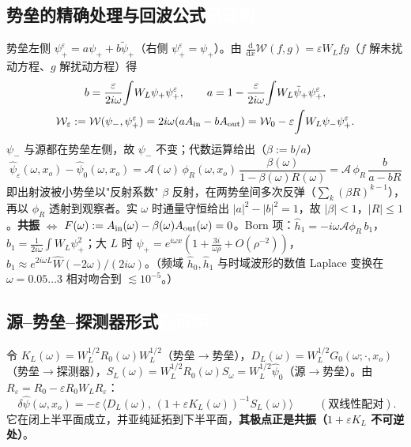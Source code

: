 \documentclass[11pt,a4paper,fontset=windows]{ctexart}
\newcommand{\tagbox}[2]{\begingroup\setlength{\fboxsep}{1.4pt}\colorbox{#1}{\textcolor{white}{\footnotesize\bfseries #2}}\endgroup}
\newcommand{\proven}{\tagbox{green!45!black}{已证明}}
\theoremstyle{definition}
\theoremstyle{definition}
\newcommand{\eps}{\varepsilon}
\newcommand{\cA}{\mathcal A}
\newcommand{\cW}{\mathcal W}
\newcommand{\Ain}{A_{\rm in}}
\newcommand{\Aout}{A_{\rm out}}
\newcommand{\dd}{\mathrm d}
\begin{document}
\subsection[势垒的精确处理与回波公式]{势垒的精确处理与回波公式\enspace\proven}
势垒左侧 $\psi_+^\eps=a\psi_++b\tilde\psi_+$（右侧 $\psi_+^\eps=\psi_+$）。由 $\frac{\dd}{\dd x}\cW(f,g)=\eps W_Lfg$（$f$ 解未扰动方程、$g$ 解扰动方程）得
\begin{gather*}
b=\frac{\eps}{2i\omega}\!\int\! W_L\psi_+\psi_+^\eps,\qquad a=1-\frac{\eps}{2i\omega}\!\int\! W_L\tilde\psi_+\psi_+^\eps,\\
\cW_\eps:=\cW(\psi_-,\psi_+^\eps)=2i\omega(a\Ain-b\Aout)=\cW_0-\eps\!\int\! W_L\psi_-\psi_+^\eps .
\end{gather*}
$\psi_-$ 与源都在势垒左侧，故 $\psi_-$ 不变；代数运算给出（$\beta:=b/a$）
\begin{equation}\label{eq:echo}
\boxed{\;\hat\psi_\eps(\omega,x_o)-\hat\psi_0(\omega,x_o)=\cA(\omega)\,\phi_R(\omega,x_o)\,\frac{\beta(\omega)}{1-\beta(\omega)R(\omega)}=\cA\,\phi_R\,\frac{b}{a-bR}\;}
\end{equation}
即出射波被小势垒以"反射系数" $\beta$ 反射，在两势垒间多次反弹（$\sum_k(\beta R)^{k-1}$），再以 $\phi_R$ 透射到观察者。实 $\omega$ 时通量守恒给出 $|a|^2-|b|^2=1$，故 $|\beta|<1$，$|R|\le1$。\textbf{共振} $\Leftrightarrow$ $F(\omega):=\Ain(\omega)-\beta(\omega)\Aout(\omega)=0$。Born 项：$\hat h_1=-i\omega\cA\phi_R\,b_1$，$b_1=\frac{1}{2i\omega}\int W_L\psi_+^2$；大 $L$ 时 $\psi_+=e^{i\omega x}(1+\frac{3i}{\omega\rho}+O(\rho^{-2}))$，$b_1\approx e^{2i\omega L}\hat W(-2\omega)/(2i\omega)$。（频域 $\hat h_0,\hat h_1$ 与时域波形的数值 Laplace 变换在 $\omega=0.05\ldots3$ 相对吻合到 $\lesssim10^{-5}$。）

\subsection[源--势垒--探测器形式]{源--势垒--探测器形式\enspace\proven}
令 $K_L(\omega)=W_L^{1/2}R_0(\omega)W_L^{1/2}$（势垒$\to$势垒），$D_L(\omega)=W_L^{1/2}G_0(\omega;\cdot,x_o)$（势垒$\to$探测器），$S_L(\omega)=W_L^{1/2}R_0(\omega)S_\omega=W_L^{1/2}\hat\psi_0$（源$\to$势垒）。由 $R_\eps=R_0-\eps R_0W_LR_\eps$：
\begin{equation}\label{eq:BS}
\boxed{\;\delta\hat\psi(\omega,x_o)=-\eps\,\big\langle D_L(\omega),\,(1+\eps K_L(\omega))^{-1}S_L(\omega)\big\rangle\;}\qquad(\text{双线性配对}).
\end{equation}
它在闭上半平面成立，并亚纯延拓到下半平面，\textbf{其极点正是共振（$1+\eps K_L$ 不可逆处）}。
\end{document}
